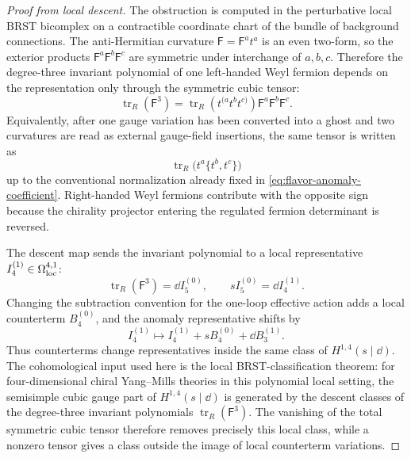 \begin{proof}[Proof from local descent]
The obstruction is computed in the perturbative local BRST bicomplex on a
contractible coordinate chart of the bundle of background connections.  The
anti-Hermitian curvature \(\mathsf F=\mathsf F^a t^a\) is an even two-form,
so the exterior products \(\mathsf F^a\mathsf F^b\mathsf F^c\) are symmetric
under interchange of \(a,b,c\).  Therefore the degree-three invariant
polynomial of one left-handed Weyl fermion depends on the representation only
through the symmetric cubic tensor:
\[
  \operatorname{tr}_{R}(\mathsf F^3)
  =
  \operatorname{tr}_{R}(t^{(a}t^bt^{c)})
  \mathsf F^a\mathsf F^b\mathsf F^c .
\]
Equivalently, after one gauge variation has been converted into a ghost and
two curvatures are read as external gauge-field insertions, the same tensor is
written as
\[
  \operatorname{tr}_{R}\bigl(t^a\{t^b,t^c\}\bigr)
\]
up to the conventional normalization already fixed in
\eqref{eq:flavor-anomaly-coefficient}.  Right-handed Weyl fermions contribute
with the opposite sign because the chirality projector entering the regulated
fermion determinant is reversed.

The descent map sends the invariant polynomial to a local representative
\(I_4^{(1)}\in\Omega_{\rm loc}^{4,1}\):
\[
  \operatorname{tr}_{R}(\mathsf F^3)=\dd I_5^{(0)},
  \qquad
  s I_5^{(0)}=\dd I_4^{(1)} .
\]
Changing the subtraction convention for the one-loop effective action adds a
local counterterm \(B_4^{(0)}\), and the anomaly representative shifts by
\[
  I_4^{(1)}
  \longmapsto
  I_4^{(1)}+sB_4^{(0)}+\dd B_3^{(1)} .
\]
Thus counterterms change representatives inside the same class of
\(H^{1,4}(s\mid\dd)\).  The cohomological input used here is the local
BRST-classification theorem: for four-dimensional chiral Yang--Mills
theories in this polynomial local setting, the semisimple cubic gauge part of
\(H^{1,4}(s\mid\dd)\) is generated by the descent classes of the degree-three
invariant polynomials \(\operatorname{tr}_{R}(\mathsf F^3)\).  The vanishing
of the total symmetric cubic tensor therefore removes precisely this local
class, while a nonzero tensor gives a class outside the image of local
counterterm variations.


\end{proof}
